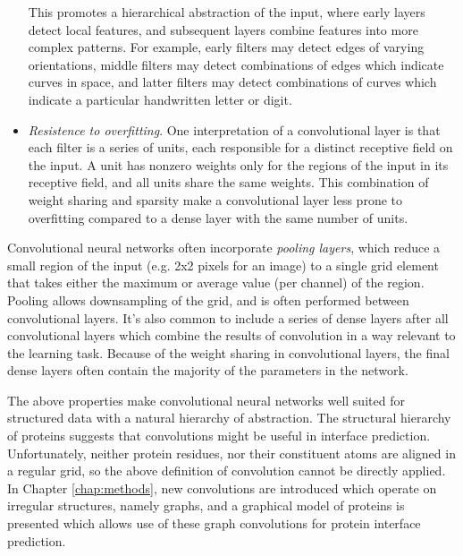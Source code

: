 \begin{itemize}
 	This promotes a hierarchical abstraction of the input, where early layers detect local features, and subsequent layers combine features into more complex patterns.
 	For example, early filters may detect edges of varying orientations, middle filters may detect combinations of edges which indicate curves in space, and latter filters may detect combinations of curves which indicate a particular handwritten letter or digit.
 	\item \textit{Resistence to overfitting}. 
 	One interpretation of a convolutional layer is that each filter is a series of units, each responsible for a distinct receptive field on the input.
 	A unit has nonzero weights only for the regions of the input in its receptive field, and all units share the same weights. 
 	This combination of weight sharing and sparsity make a convolutional layer less prone to overfitting compared to a dense layer with the same number of units.
 \end{itemize}

Convolutional neural networks often incorporate \textit{pooling layers}, which reduce a small region of the input (e.g. 2x2 pixels for an image) to a single grid element that takes either the maximum or average value (per channel) of the region. 
Pooling allows downsampling of the grid, and is often performed between convolutional layers. 
It's also common to include a series of dense layers after all convolutional layers which combine the results of convolution in a way relevant to the learning task.
Because of the weight sharing in convolutional layers, the final dense layers often contain the majority of the parameters in the network.


 The above properties make convolutional neural networks well suited for structured data with a natural hierarchy of abstraction.
 The structural hierarchy of proteins suggests that convolutions might be useful in interface prediction.
 Unfortunately, neither protein residues, nor their constituent atoms are aligned in a regular grid, so the above definition of convolution cannot be directly applied. 
 In Chapter \ref{chap:methods}, new convolutions are introduced which operate on irregular structures, namely graphs, and a graphical model of proteins is presented which allows use of these graph convolutions for protein interface prediction.